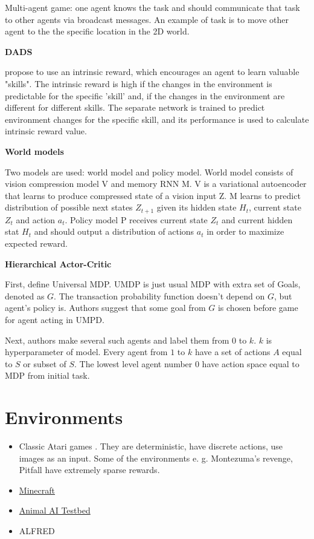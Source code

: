 \documentclass{article}
\begin{document}
Multi-agent game: one agent knows the task and should communicate that task to other agents via broadcast messages. An example of task is to move other agent to the the specific location in the 2D world.

\textbf{DADS}

\citep{Sharma2020DynamicsAwareUD} propose to use an intrinsic reward, which encourages an agent to learn valuable "skills". The intrinsic reward is high if the changes in the environment is predictable for the specific 'skill' and, if the changes in the environment are different for different skills. The separate network is trained to predict environment changes for the specific skill, and its performance is used to calculate intrinsic reward value.

\textbf{World models}~\citep{Ha2018RecurrentWM}

Two models are used: world model and policy model. World model consists of vision compression model V and memory RNN M. V is a variational autoencoder that learns to produce compressed state of a vision input Z. M learns to predict distribution of possible next states $Z_{t+1}$ given its hidden state $H_t$, current state $Z_t$ and action $a_t$. Policy model P receives current state $Z_t$ and current hidden stat $H_t$ and should output a distribution of actions $a_t$ in order to maximize expected reward.

\textbf{Hierarchical Actor-Critic}~\citep{levy2017learning}

First, define Universal MDP. UMDP is just usual MDP with extra set of Goals, denoted as $G$. The transaction probability function doesn't depend on $G$, but agent's policy is. Authors suggest that some goal from $G$ is chosen before game for agent acting in UMPD.

Next, authors make several such agents and label them from $0$ to $k$. $k$ is hyperparameter of model. Every agent from $1$ to $k$ have a set of actions $A$ equal to $S$ or subset of $S$. The lowest level agent number $0$ have action space equal to MDP from initial task.

\section{Environments}

\begin{itemize}
  \item Classic Atari games \citep{Mnih2013PlayingAW}. They are deterministic, have discrete actions, use images as an input. Some of the environments e. g. Montezuma's revenge, Pitfall have extremely sparse rewards.
  \item \href{https://minerl.io/competition/}{Minecraft}
  \item \href{http://animalaiolympics.com/AAI/}{Animal AI Testbed} 
  \item ALFRED~\citep{ALFRED20}
\end{itemize}



\end{document}
